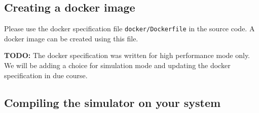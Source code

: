 \documentclass[12pt,a4paper]{article}
\begin{document}
\subsection{Creating a docker image}

Please use the docker specification file \texttt{docker/Dockerfile} in the source code. A docker image can be created using this file.

\textbf{TODO:} The docker specification was written for high performance mode only. We will be adding a choice for simulation mode and updating the docker specification in due course.

\subsection{Compiling the simulator on your system}
\end{document}
